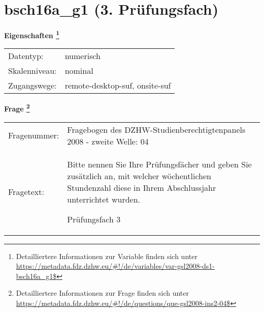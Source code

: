 
    \setcounter{footnote}{0}

    \vspace*{-1.8cm}
	\section{bsch16a\_g1 (3. Prüfungsfach)}
	\label{section:bsch16a_g1}



    \vspace*{0.5cm}
    \noindent\textbf{Eigenschaften
	\footnote{Detailliertere Informationen zur Variable finden sich unter
		\url{https://metadata.fdz.dzhw.eu/\#!/de/variables/var-gsl2008-ds1-bsch16a_g1$}}}\\
	\begin{tabularx}{\hsize}{@{}lX}
	Datentyp: & numerisch \\
	Skalenniveau: & nominal \\
	Zugangswege: &
	  remote-desktop-suf, 
	  onsite-suf
 \\
    \end{tabularx}



				\vspace*{0.5cm}
                \noindent\textbf{Frage
	                \footnote{Detailliertere Informationen zur Frage finden sich unter
		              \url{https://metadata.fdz.dzhw.eu/\#!/de/questions/que-gsl2008-ins2-04$}}}\\
				\begin{tabularx}{\hsize}{@{}lX}
					Fragenummer: &
					  Fragebogen des DZHW-Studienberechtigtenpanels 2008 - zweite Welle:
					  04
 \\
					Fragetext: & Bitte nennen Sie Ihre Prüfungsfächer und geben Sie zusätzlich an, mit welcher wöchentlichen Stundenzahl diese in Ihrem Abschlussjahr unterrichtet wurden.\par  Prüfungsfach 3 \\
				\end{tabularx}





